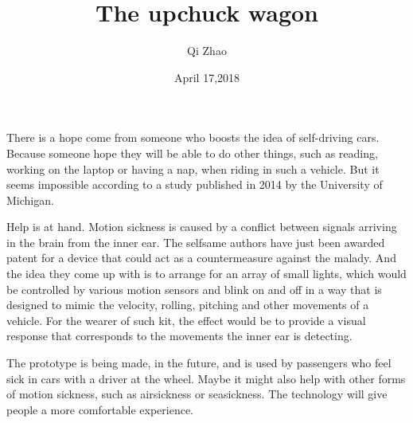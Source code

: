 \documentclass{article}
\author{Qi Zhao}
\date{April 17,2018}
\title{The upchuck wagon}
\begin{document}
\maketitle
\par There is a hope come from someone who boosts the idea of self-driving cars. Because someone hope they will be able to do other things, such as reading, working on the laptop or having a nap, when riding in such a vehicle. But it seems impossible according to a study published in 2014 by the University of Michigan.
\par Help is at hand. Motion sickness is caused by a conflict between signals arriving in the brain from the inner ear. The selfsame authors have just been awarded patent for a device that could act as a countermeasure against the malady. And the idea they come up with is to arrange for an array of small lights, which would be controlled by various motion sensors and blink on and off in a way that is designed to mimic the velocity, rolling, pitching and other movements of a vehicle. For the wearer of such kit, the effect would be to provide a visual response that corresponds to the movements the inner ear is detecting.
\par The prototype is being made, in the future, and is used by passengers who feel sick in cars with a driver at the wheel. Maybe it might also help with other forms of motion sickness, such as airsickness or seasickness. The technology will give people a more comfortable experience.
\end{document}
